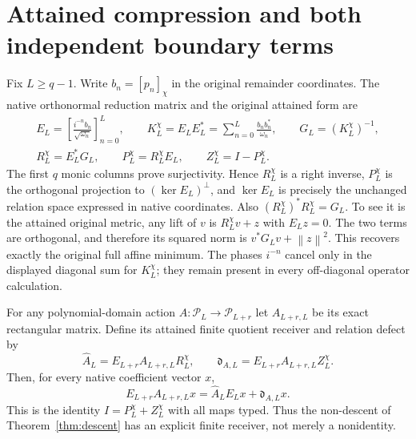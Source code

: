 \documentclass[11pt]{article}
\newcommand{\PP}{\mathcal P}\newcommand{\HH}{\mathcal H}
\newcommand{\norm}[1]{\left\lVert#1\right\rVert}
\begin{document}
\section{Attained compression and both independent boundary terms}

Fix $L\geq q-1$. Write $b_n=[p_n]_\chi$ in the original
remainder coordinates. The native orthonormal reduction
matrix and the original attained form are
\begin{equation}\label{eq:finitequotient}
 \begin{gathered}
 E_L=\left[\frac{i^{-n}b_n}{\sqrt{\omega_n}}\right]_{n=0}^L,
 \qquad K_L^\chi=E_LE_L^*
           =\sum_{n=0}^L\frac{b_nb_n^*}{\omega_n},
 \qquad G_L=(K_L^\chi)^{-1},\\
 R_L^\chi=E_L^*G_L,\qquad
 P_L^\chi=R_L^\chi E_L,\qquad Z_L^\chi=I-P_L^\chi.
 \end{gathered}
\end{equation}
The first $q$ monic columns prove surjectivity.
Hence $R_L^\chi$ is a right inverse, $P_L^\chi$
is the orthogonal projection to $(\ker E_L)^\perp$,
and $\ker E_L$ is precisely the unchanged relation
space expressed in native coordinates.
Also $(R_L^\chi)^*R_L^\chi=G_L$.
To see it is the attained original metric, any lift
of $v$ is $R_L^\chi v+z$ with $E_Lz=0$.
The two terms are orthogonal, and therefore its
squared norm is $v^*G_Lv+\norm z^2$.
This recovers exactly the original full affine minimum.
The phases $i^{-n}$ cancel only in the displayed
diagonal sum for $K_L^\chi$; they remain present
in every off-diagonal operator calculation.

For any polynomial-domain action $A:\PP_L\to\PP_{L+r}$
let $A_{L+r,L}$ be its exact rectangular matrix.
Define its attained finite quotient receiver and relation
defect by
\begin{equation}\label{eq:generalreceiver}
 \widehat A_L=E_{L+r}A_{L+r,L}R_L^\chi,\qquad
 \mathfrak d_{A,L}=E_{L+r}A_{L+r,L}Z_L^\chi.
\end{equation}
Then, for every native coefficient vector $x$,
\begin{equation}\label{eq:relationidentity}
 E_{L+r}A_{L+r,L}x
        =\widehat A_LE_Lx+\mathfrak d_{A,L}x.
\end{equation}
This is the identity $I=P_L^\chi+Z_L^\chi$ with
all maps typed. Thus the non-descent of
Theorem~\ref{thm:descent} has an explicit finite receiver,
not merely a nonidentity.
\end{document}

